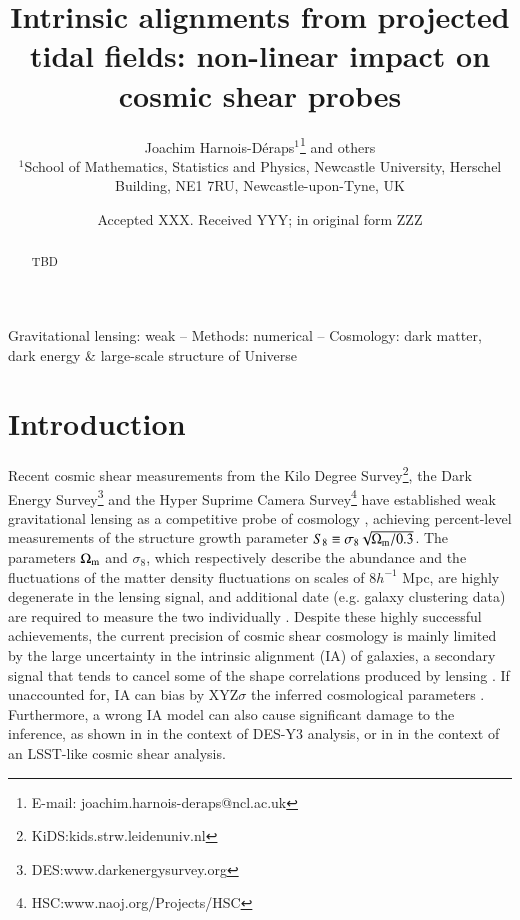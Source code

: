 \documentclass[useAMS,usenatbib]{mn2e}
\title[Lensing beyond 2pt: accounting for IA]{Intrinsic alignments from projected tidal fields: non-linear  impact on cosmic shear probes}
\author[J. Harnois-D\'{e}raps et al.]{Joachim Harnois-D\'{e}raps$^{1}$\thanks{E-mail: joachim.harnois-deraps@ncl.ac.uk} and others
\\
$^{1}$School of Mathematics, Statistics and Physics, Newcastle University, Herschel Building, NE1 7RU, Newcastle-upon-Tyne, UK\\
}
\date{Accepted XXX. Received YYY; in original form ZZZ}
\begin{document}
\label{firstpage}
\maketitle

\begin{abstract}
TBD
\end{abstract}

\begin{keywords}
Gravitational lensing: weak -- Methods: numerical -- Cosmology: dark matter, dark energy \& large-scale structure of Universe 
\end{keywords}



  
\section{Introduction}
\label{sec:intro}

Recent cosmic shear measurements from the Kilo Degree Survey\footnote{KiDS:kids.strw.leidenuniv.nl}, the Dark Energy Survey\footnote{DES:www.darkenergysurvey.org} and the Hyper Suprime Camera Survey\footnote{HSC:www.naoj.org/Projects/HSC} have established weak gravitational lensing as a competitive probe of cosmology \citep[see. e.g.,][]{KiDS1000_Asgari, KiDS1000_vdB, KiDS1000_Li, DESY3_Secco, DESY3_Amon, HSCY3_Cl, HSCY3_2PCF}, achieving  percent-level measurements of the structure growth parameter $S_8\equiv\sigma_8\sqrt{\Omega_{\rm m}/0.3}$. The parameters $\Omega_{\rm m}$ and $\sigma_8$, which respectively describe the abundance and the fluctuations of the matter density fluctuations  on scales of $8h^{-1}$ Mpc, are highly degenerate in the lensing signal, and additional date (e.g. galaxy clustering data) are required to measure the two individually \citep{Heymans, DES3x2pt, HSC3x2}. Despite these highly successful achievements, the current precision of cosmic shear cosmology is mainly limited by the large uncertainty in the intrinsic alignment  (IA) of galaxies, a secondary signal that tends to cancel some of the shape correlations produced by lensing \citep[see. e.g. ][for reviews on IA]{Joachim_IA, Kiessling_IA}. If unaccounted for, IA can bias by XYZ$\sigma$ the inferred cosmological parameters \citep{BlazekKrause}. Furthermore, a wrong IA model can also cause significant damage to the inference, as shown in \citet{DESY3_Secco} in the context of DES-Y3 analysis, or in \citep{Paopiamsap2024} in the context of an LSST-like cosmic shear analysis. 
\end{document}

